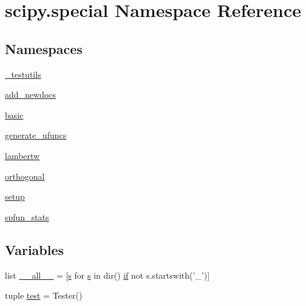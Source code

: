 \hypertarget{namespacescipy_1_1special}{}\section{scipy.\+special Namespace Reference}
\label{namespacescipy_1_1special}
\subsection*{Namespaces}
\begin{DoxyCompactItemize}
\item 
 \hyperlink{namespacescipy_1_1special_1_1__testutils}{\+\_\+testutils}
\item 
 \hyperlink{namespacescipy_1_1special_1_1add__newdocs}{add\+\_\+newdocs}
\item 
 \hyperlink{namespacescipy_1_1special_1_1basic}{basic}
\item 
 \hyperlink{namespacescipy_1_1special_1_1generate__ufuncs}{generate\+\_\+ufuncs}
\item 
 \hyperlink{namespacescipy_1_1special_1_1lambertw}{lambertw}
\item 
 \hyperlink{namespacescipy_1_1special_1_1orthogonal}{orthogonal}
\item 
 \hyperlink{namespacescipy_1_1special_1_1setup}{setup}
\item 
 \hyperlink{namespacescipy_1_1special_1_1spfun__stats}{spfun\+\_\+stats}
\end{DoxyCompactItemize}
\subsection*{Variables}
\begin{DoxyCompactItemize}
\item 
list \hyperlink{namespacescipy_1_1special_aec366720a01dcdb5739dbba9d6b53c2f}{\+\_\+\+\_\+all\+\_\+\+\_\+} = \mbox{[}\hyperlink{indexexpr_8h_ae024b0db549122b44c349ae28ec990dc}{s} for \hyperlink{indexexpr_8h_ae024b0db549122b44c349ae28ec990dc}{s} in dir() \hyperlink{minmax_8h_a30a0ee9fee303f01d9c5e6f669e0dfe9}{if} not s.\+startswith('\+\_\+')\mbox{]}
\item 
tuple \hyperlink{namespacescipy_1_1special_ac968122277b6602565fea595d4d60936}{test} = Tester()
\end{DoxyCompactItemize}


